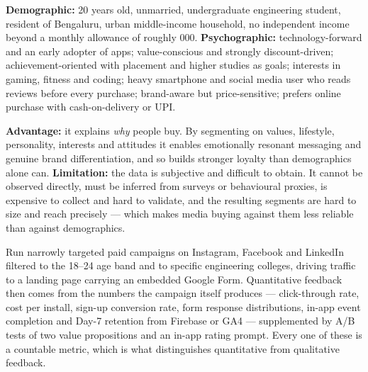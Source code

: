 \begin{qlist}
\textbf{Demographic:} 20 years old, unmarried, undergraduate engineering
student, resident of Bengaluru, urban middle-income household, no independent
income beyond a monthly allowance of roughly 000.
\textbf{Psychographic:} technology-forward and an early adopter of apps;
value-conscious and strongly discount-driven; achievement-oriented with
placement and higher studies as goals; interests in gaming, fitness and
coding; heavy smartphone and social media user who reads reviews before every
purchase; brand-aware but price-sensitive; prefers online purchase with
cash-on-delivery or UPI.

\textbf{Advantage:} it explains \emph{why} people buy. By segmenting on values,
lifestyle, personality, interests and attitudes it enables emotionally
resonant messaging and genuine brand differentiation, and so builds stronger
loyalty than demographics alone can.
\textbf{Limitation:} the data is subjective and difficult to obtain. It cannot
be observed directly, must be inferred from surveys or behavioural proxies, is
expensive to collect and hard to validate, and the resulting segments are hard
to size and reach precisely --- which makes media buying against them less
reliable than against demographics.

Run narrowly targeted paid campaigns on Instagram, Facebook and LinkedIn
filtered to the 18--24 age band and to specific engineering colleges, driving
traffic to a landing page carrying an embedded Google Form. Quantitative
feedback then comes from the numbers the campaign itself produces ---
click-through rate, cost per install, sign-up conversion rate, form response
distributions, in-app event completion and Day-7 retention from Firebase or
GA4 --- supplemented by A/B tests of two value propositions and an in-app
rating prompt. Every one of these is a countable metric, which is what
distinguishes quantitative from qualitative feedback.


\end{qlist}
